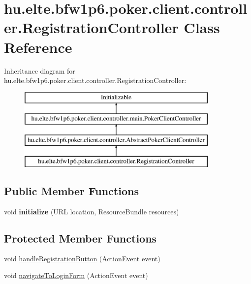 \hypertarget{classhu_1_1elte_1_1bfw1p6_1_1poker_1_1client_1_1controller_1_1_registration_controller}{}\section{hu.\+elte.\+bfw1p6.\+poker.\+client.\+controller.\+Registration\+Controller Class Reference}
\label{classhu_1_1elte_1_1bfw1p6_1_1poker_1_1client_1_1controller_1_1_registration_controller}
Inheritance diagram for hu.\+elte.\+bfw1p6.\+poker.\+client.\+controller.\+Registration\+Controller\+:\begin{figure}[H]
\begin{center}
\leavevmode
\includegraphics[height=4.000000cm]{classhu_1_1elte_1_1bfw1p6_1_1poker_1_1client_1_1controller_1_1_registration_controller}
\end{center}
\end{figure}
\subsection*{Public Member Functions}
\begin{DoxyCompactItemize}
\item 
\hypertarget{classhu_1_1elte_1_1bfw1p6_1_1poker_1_1client_1_1controller_1_1_registration_controller_ac4b1f1f74f93b5c2ae2eeb75efa2a353}{}void {\bfseries initialize} (U\+R\+L location, Resource\+Bundle resources)\label{classhu_1_1elte_1_1bfw1p6_1_1poker_1_1client_1_1controller_1_1_registration_controller_ac4b1f1f74f93b5c2ae2eeb75efa2a353}

\end{DoxyCompactItemize}
\subsection*{Protected Member Functions}
\begin{DoxyCompactItemize}
\item 
void \hyperlink{classhu_1_1elte_1_1bfw1p6_1_1poker_1_1client_1_1controller_1_1_registration_controller_a9c0ac2bf8dee91fd76e40b50f26682cc}{handle\+Registration\+Button} (Action\+Event event)
\item 
void \hyperlink{classhu_1_1elte_1_1bfw1p6_1_1poker_1_1client_1_1controller_1_1_registration_controller_a3820a348b5f594d5db0d4cb2ae0f1079}{navigate\+To\+Login\+Form} (Action\+Event event)
\end{DoxyCompactItemize}
